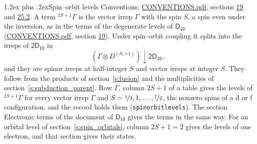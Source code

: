 \documentclass[10pt,a4paper]{article}
\makeatletter
\renewcommand\section{\@startsection{section}{1}{\z@}{-3ex plus -1ex minus -.2ex}%
  {1.2ex plus .2ex}{\normalfont\large\sffamily\bfseries\color{parttitle}}}
\numberwithin{equation}{section}
\newcommand{\grp}[1]{\mathsf{#1}}
\newcommand{\restr}[2]{#1\!\downarrow#2}
\newcommand{\irrJp}[2]{D^{(#1,#2)}}
\newcommand{\irrprod}{\otimes}
\newcommand{\term}[2]{{}^{#1}#2}
\makeatother
\begin{document}
\section{Spin--orbit levels}\label{s:spin_orbit}
Conventions: \href{../../CONVENTIONS.pdf}{CONVENTIONS.pdf}, sections \href{../../../rotation/CONVENTIONS.pdf\#conv.19}{19} and \href{../../CONVENTIONS.pdf\#conv.25.2}{25.2}.
\leavevmode\label{n:local.spin}\label{n:symbol.term}A term $\term{2S+1}{\Gamma}$ is the vector irrep $\Gamma$ with the spin $S$, a spin even under the inversion, as in the terms of the degenerate levels of \href{../../../rotation/data/pdf/D10.pdf}{$\grp{D_{10}}$} (\href{../../CONVENTIONS.pdf}{CONVENTIONS.pdf}, section \href{../../../rotation/CONVENTIONS.pdf\#conv.19}{19}). Under spin--orbit coupling it splits into the irreps of $\grp{2D_{10}}$ in
\begin{equation}\label{e:spinorbit}\restr{(\Gamma \irrprod \irrJp{S}{+1})}{\grp{2D_{10}}},\end{equation}
and they are spinor irreps at half-integer $S$ and vector irreps at integer $S$. They follow from the products of section~\ref{s:fusion} and the multiplicities of section~\ref{s:subduction_parent}. Row $\Gamma$, column $2S + 1$ of a table gives the levels of $\term{2S+1}{\Gamma}$ for every vector irrep $\Gamma$ and $S = \nicefrac{1}{2}, 1, \dots, \nicefrac{7}{2}$, the nonzero spins of a d or f configuration, and the record holds them (\texttt{spinorbitlevels}). The section Electronic terms of the document of \href{../../../rotation/data/pdf/D10.pdf}{$\grp{D_{10}}$} gives the terms in the same way. For an orbital level of section~\ref{s:spin_orbitals}, column $2S + 1 = 2$ gives the levels of one electron, and that section gives their states.
\end{document}

